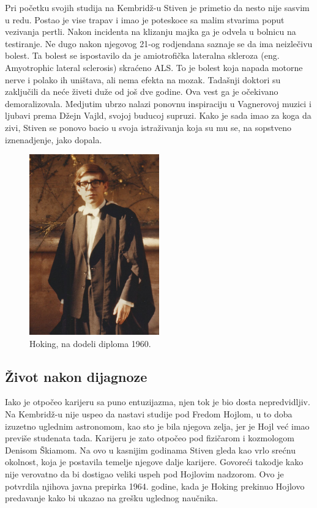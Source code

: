 \documentclass[a4paper, 12pt]{article}
\begin{document}
{Pri početku svojih studija na Kembridž-u Stiven je primetio da nesto nije sasvim u 
redu. Postao je vise trapav i imao je poteskoce sa malim stvarima poput vezivanja 
pertli. Nakon incidenta na klizanju majka ga je odvela u bolnicu na testiranje. Ne 
dugo nakon njegovog 21-og rodjendana saznaje se da ima neizlečivu bolest. Ta bolest 
se ispostavilo da je amiotrofička lateralna skleroza (eng. Amyotrophic lateral 
sclerosis) skraćeno ALS. To je bolest koja napada motorne nerve i polako ih uništava, 
ali nema efekta na mozak. Tadašnji doktori su zaključili da neće živeti duže od još 
dve godine. Ova vest ga je očekivano demoralizovala. Medjutim ubrzo nalazi ponovnu 
inspiraciju u Vagnerovoj muzici i ljubavi prema Džejn Vajld, svojoj buducoj supruzi. 
Kako je sada imao za koga da zivi, Stiven se ponovo bacio u svoja istraživanja koja 
su mu se, na sopstveno iznenadjenje, jako dopala. 

\begin{figure}[h!]
\centering
\includegraphics[width=0.5\textwidth]{Hoking,PreDijagnoze.jpg}
\caption{Hoking, na dodeli diploma 1960.}
\end{figure}

\subsection{Život nakon dijagnoze}
Iako je otpočeo karijeru sa puno entuzijazma, njen tok je bio dosta nepredvidljiv. 
Na Kembridž-u nije uspeo da nastavi studije pod Fredom Hojlom, u to doba izuzetno 
uglednim astronomom, kao sto je bila njegova zelja, jer je Hojl već imao previše 
studenata tada. Karijeru je zato otpočeo pod fizičarom i kozmologom Denisom Škiamom. 
Na ovo u kasnijim godinama Stiven gleda kao vrlo srećnu okolnost, koja je postavila 
temelje njegove dalje karijere. Govoreći takodje kako nije verovatno da bi dostigao 
veliki uspeh pod Hojlovim nadzorom. Ovo je potvrdila njihova javna prepirka 1964. 
godine, kada je Hoking prekinuo Hojlovo predavanje kako bi ukazao na grešku uglednog 
naučnika. \medskip
\newpage

}
\end{document}
